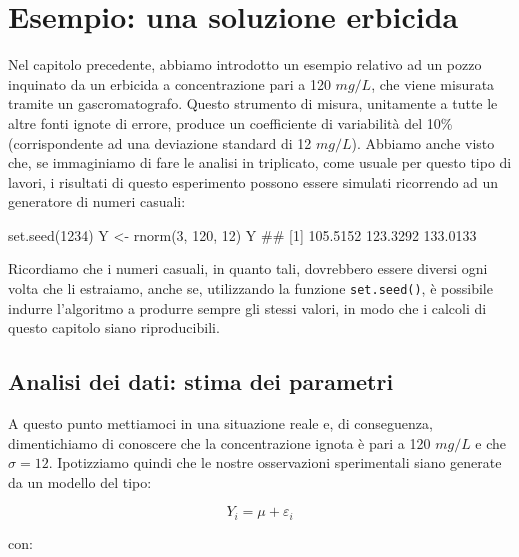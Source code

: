 \documentclass[a4paper,12pt,oneside]{book}
\newenvironment{Shaded}{\begin{snugshade}}{\end{snugshade}}
\newcommand{\DecValTok}[1]{#1}
\newcommand{\DocumentationTok}[1]{#1}
\newcommand{\OtherTok}[1]{#1}
\newcommand{\FunctionTok}[1]{#1}
\newcommand{\NormalTok}[1]{#1}
\begin{document}
\hypertarget{esempio-una-soluzione-erbicida}{%
\section{Esempio: una soluzione erbicida}\label{esempio-una-soluzione-erbicida}}

Nel capitolo precedente, abbiamo introdotto un esempio relativo ad un pozzo inquinato da un erbicida a concentrazione pari a 120 \(mg/L\), che viene misurata tramite un gascromatografo. Questo strumento di misura, unitamente a tutte le altre fonti ignote di errore, produce un coefficiente di variabilità del 10\% (corrispondente ad una deviazione standard di 12 \(mg/L\)). Abbiamo anche visto che, se immaginiamo di fare le analisi in triplicato, come usuale per questo tipo di lavori, i risultati di questo esperimento possono essere simulati ricorrendo ad un generatore di numeri casuali:

\begin{Shaded}
\begin{Highlighting}[]
\FunctionTok{set.seed}\NormalTok{(}\DecValTok{1234}\NormalTok{)}
\NormalTok{Y }\OtherTok{\textless{}{-}} \FunctionTok{rnorm}\NormalTok{(}\DecValTok{3}\NormalTok{, }\DecValTok{120}\NormalTok{, }\DecValTok{12}\NormalTok{)}
\NormalTok{Y}
\DocumentationTok{\#\# [1] 105.5152 123.3292 133.0133}
\end{Highlighting}
\end{Shaded}

Ricordiamo che i numeri casuali, in quanto tali, dovrebbero essere diversi ogni volta che li estraiamo, anche se, utilizzando la funzione \texttt{set.seed()}, è possibile indurre l'algoritmo a produrre sempre gli stessi valori, in modo che i calcoli di questo capitolo siano riproducibili.

\hypertarget{analisi-dei-dati-stima-dei-parametri}{%
\subsection{Analisi dei dati: stima dei parametri}\label{analisi-dei-dati-stima-dei-parametri}}

A questo punto mettiamoci in una situazione reale e, di conseguenza, dimentichiamo di conoscere che la concentrazione ignota è pari a 120 \(mg/L\) e che \(\sigma = 12\). Ipotizziamo quindi che le nostre osservazioni sperimentali siano generate da un modello del tipo:

\[Y_i = \mu + \varepsilon_i\]

con:
\end{document}
